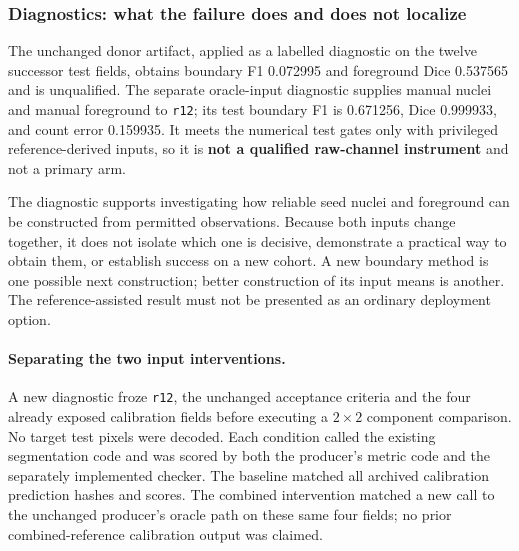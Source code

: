 \subsubsection{Diagnostics: what the failure does and does not localize}

The unchanged donor artifact, applied as a labelled diagnostic on the twelve successor test fields, obtains boundary F1 0.072995 and foreground Dice 0.537565 and is unqualified. The separate oracle-input diagnostic supplies manual nuclei and manual foreground to \texttt{r12}; its test boundary F1 is 0.671256, Dice 0.999933, and count error 0.159935. It meets the numerical test gates only with privileged reference-derived inputs, so it is \textbf{not a qualified raw-channel instrument} and not a primary arm.

The diagnostic supports investigating how reliable seed nuclei and foreground can be constructed from permitted observations. Because both inputs change together, it does not isolate which one is decisive, demonstrate a practical way to obtain them, or establish success on a new cohort. A new boundary method is one possible next construction; better construction of its input means is another. The reference-assisted result must not be presented as an ordinary deployment option.

\paragraph{Separating the two input interventions.}
A new diagnostic froze \texttt{r12}, the unchanged acceptance criteria and the four already exposed calibration fields before executing a $2\times2$ component comparison. No target test pixels were decoded. Each condition called the existing segmentation code and was scored by both the producer's metric code and the separately implemented checker. The baseline matched all archived calibration prediction hashes and scores. The combined intervention matched a new call to the unchanged producer's oracle path on these same four fields; no prior combined-reference calibration output was claimed.

